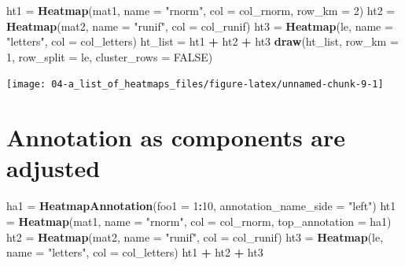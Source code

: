 \documentclass[]{book}
\newenvironment{Shaded}{\begin{snugshade}}{\end{snugshade}}
\newcommand{\KeywordTok}[1]{\textcolor[rgb]{0.13,0.29,0.53}{\textbf{#1}}}
\newcommand{\DataTypeTok}[1]{\textcolor[rgb]{0.13,0.29,0.53}{#1}}
\newcommand{\DecValTok}[1]{\textcolor[rgb]{0.00,0.00,0.81}{#1}}
\newcommand{\StringTok}[1]{\textcolor[rgb]{0.31,0.60,0.02}{#1}}
\newcommand{\OtherTok}[1]{\textcolor[rgb]{0.56,0.35,0.01}{#1}}
\newcommand{\OperatorTok}[1]{\textcolor[rgb]{0.81,0.36,0.00}{\textbf{#1}}}
\newcommand{\NormalTok}[1]{#1}
\theoremstyle{definition}
\theoremstyle{definition}
\theoremstyle{definition}
\theoremstyle{remark}
\begin{document}
\begin{Shaded}
\begin{Highlighting}[]
\NormalTok{ht1 =}\StringTok{ }\KeywordTok{Heatmap}\NormalTok{(mat1, }\DataTypeTok{name =} \StringTok{"rnorm"}\NormalTok{, }\DataTypeTok{col =}\NormalTok{ col_rnorm, }\DataTypeTok{row_km =} \DecValTok{2}\NormalTok{)}
\NormalTok{ht2 =}\StringTok{ }\KeywordTok{Heatmap}\NormalTok{(mat2, }\DataTypeTok{name =} \StringTok{"runif"}\NormalTok{, }\DataTypeTok{col =}\NormalTok{ col_runif)}
\NormalTok{ht3 =}\StringTok{ }\KeywordTok{Heatmap}\NormalTok{(le, }\DataTypeTok{name =} \StringTok{"letters"}\NormalTok{, }\DataTypeTok{col =}\NormalTok{ col_letters)}
\NormalTok{ht_list =}\StringTok{ }\NormalTok{ht1 }\OperatorTok{+}\StringTok{ }\NormalTok{ht2 }\OperatorTok{+}\StringTok{ }\NormalTok{ht3}
\KeywordTok{draw}\NormalTok{(ht_list, }\DataTypeTok{row_km =} \DecValTok{1}\NormalTok{, }\DataTypeTok{row_split =}\NormalTok{ le, }\DataTypeTok{cluster_rows =} \OtherTok{FALSE}\NormalTok{)}
\end{Highlighting}
\end{Shaded}

\begin{center}\texttt{[image: 04-a\_list\_of\_heatmaps\_files/figure-latex/unnamed-chunk-9-1]} \end{center}

\section{Annotation as components are
adjusted}\label{annotation-as-components-are-adjusted}

\begin{Shaded}
\begin{Highlighting}[]
\NormalTok{ha1 =}\StringTok{ }\KeywordTok{HeatmapAnnotation}\NormalTok{(}\DataTypeTok{foo1 =} \DecValTok{1}\OperatorTok{:}\DecValTok{10}\NormalTok{, }\DataTypeTok{annotation_name_side =} \StringTok{"left"}\NormalTok{)}
\NormalTok{ht1 =}\StringTok{ }\KeywordTok{Heatmap}\NormalTok{(mat1, }\DataTypeTok{name =} \StringTok{"rnorm"}\NormalTok{, }\DataTypeTok{col =}\NormalTok{ col_rnorm, }\DataTypeTok{top_annotation =}\NormalTok{ ha1)}
\NormalTok{ht2 =}\StringTok{ }\KeywordTok{Heatmap}\NormalTok{(mat2, }\DataTypeTok{name =} \StringTok{"runif"}\NormalTok{, }\DataTypeTok{col =}\NormalTok{ col_runif)}
\NormalTok{ht3 =}\StringTok{ }\KeywordTok{Heatmap}\NormalTok{(le, }\DataTypeTok{name =} \StringTok{"letters"}\NormalTok{, }\DataTypeTok{col =}\NormalTok{ col_letters)}
\NormalTok{ht1 }\OperatorTok{+}\StringTok{ }\NormalTok{ht2 }\OperatorTok{+}\StringTok{ }\NormalTok{ht3}
\end{Highlighting}
\end{Shaded}
\end{document}
